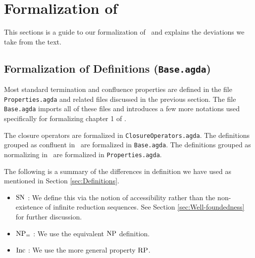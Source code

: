\section{Formalization of \terese}
\label{sec:Formalization}
This sections is a guide to our formalization of \terese $\,$ and explains the deviations we take from the text.

\subsection{Formalization of Definitions (\texttt{Base.agda})}\label{subsec:def}


Most standard termination and confluence properties are defined in the file \texttt{Properties.agda} and related files discussed in the previous section.  The file \texttt{Base.agda} imports all of these files
and introduces a few more notations used specifically for formalizing chapter 1 of \cite{Terese}.

The closure operators are formalized in \texttt{ClosureOperators.agda}.
The definitions grouped as confluent in \terese $\,$ are formalized in \texttt{Base.agda}.
The definitions grouped as normalizing in \terese $\,$ are formalized in \texttt{Properties.agda}.



The following is a summary of the differences in definition we have used as mentioned in Section \ref{sec:Definitions}.
\begin{itemize}
    \item $\mathrm{SN}$ : We define this via the notion of accessibility rather than the non-existence of infinite reduction sequences.
     See Section \ref{sec:Well-foundedness} for further discussion.
    \item $\mathrm{NP_=}$ : We use the equivalent $\mathrm{NP}$ definition.
    \item $\mathrm{Inc}$ : We use the more general property $\mathrm{RP}$.
\end{itemize}

